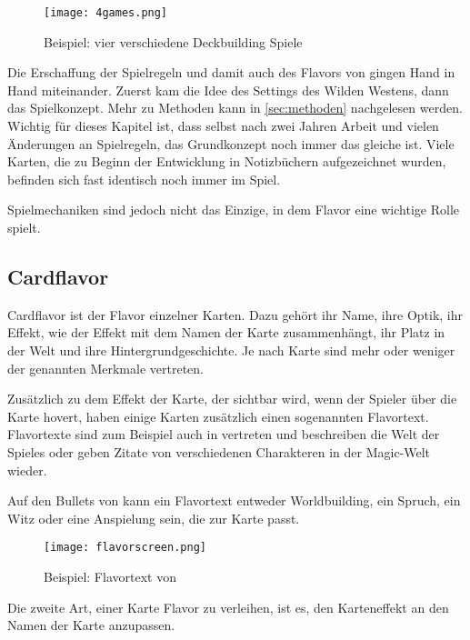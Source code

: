 \begin{figure}[H]
    \centering
    \texttt{[image: 4games.png]}
    \caption{Beispiel: vier verschiedene Deckbuilding Spiele}
\end{figure}


Die Erschaffung der Spielregeln und damit auch des Flavors von \FF gingen Hand in Hand miteinander.
Zuerst kam die Idee des Settings des Wilden Westens, dann das Spielkonzept. Mehr zu Methoden kann in \ref{sec:methoden}
nachgelesen werden. Wichtig für dieses Kapitel ist, dass selbst nach zwei Jahren Arbeit und vielen Änderungen an Spielregeln,
das Grundkonzept noch immer das gleiche ist. Viele Karten, die zu Beginn der Entwicklung in Notizbüchern aufgezeichnet wurden, befinden sich
fast identisch noch immer im Spiel.



Spielmechaniken sind jedoch nicht das Einzige, in dem Flavor eine wichtige Rolle spielt.

\subsection{Cardflavor}\label{subsec:cardflavor}

Cardflavor ist der Flavor einzelner Karten.
Dazu gehört ihr Name, ihre Optik, ihr Effekt, wie der Effekt mit dem Namen der Karte zusammenhängt,
ihr Platz in der Welt und ihre Hintergrundgeschichte. Je nach Karte sind mehr oder weniger der genannten
Merkmale vertreten.


Zusätzlich zu dem Effekt der Karte, der sichtbar wird, wenn der Spieler über die Karte hovert, haben einige Karten zusätzlich einen sogenannten Flavortext.
Flavortexte sind zum Beispiel auch in  vertreten und beschreiben die Welt der Spieles oder geben
Zitate von verschiedenen Charakteren in der Magic-Welt wieder.


Auf den Bullets von \FF kann ein Flavortext entweder Worldbuilding, ein Spruch, ein Witz oder eine Anspielung sein, die zur Karte passt.


\begin{figure}[H]
    \centering
    \texttt{[image: flavorscreen.png]}
    \caption{Beispiel: Flavortext von }
\end{figure}


Die zweite Art, einer Karte Flavor zu verleihen, ist es, den Karteneffekt an den Namen der Karte anzupassen.



